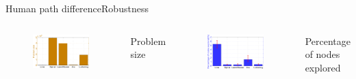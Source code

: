 \begin{frame}{Human path difference}{Robustness}

\begin{columns}

\begin{minipage}{\textwidth}
\begin{figure}
\centering
\includegraphics[width=\textwidth]{./figure/ProbSizeInDiffHMP}
\end{figure}
\begin{center}
{\small
\textcolor{metric-PR}{Problem size}
}
\end{center}
\end{minipage}

\begin{minipage}{\textwidth}
\begin{figure}
\centering
\includegraphics[width=\textwidth]{./figure/ExpRatioInDiffHMP}
\end{figure}
\end{minipage}
\begin{center}
{\small
\textcolor{metric-NE}{Percentage of nodes explored}
}
\end{center}
\end{columns}


\end{frame}
